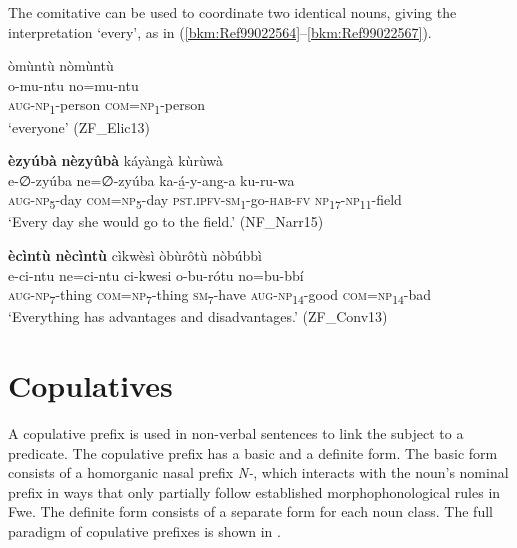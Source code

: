 The comitative can be used to coordinate two identical nouns, giving the interpretation ‘every’, as in (\ref{bkm:Ref99022564}--\ref{bkm:Ref99022567}).

\ea
\label{bkm:Ref99022564}
òmùntù nòmùntù\\
\gll o-mu-ntu    no=mu-ntu\\
\textsc{aug}-\textsc{np}\textsubscript{1}-person  \textsc{com}=\textsc{np}\textsubscript{1}-person\\
\glt ‘everyone’ (ZF\_Elic13)
\z

\ea
\textbf{èzyúbà} \textbf{nèzyûbà} káyàngà kùrùwà\\
\gll e-∅-zyúba    ne=∅-zyúba    ka-á̲-y-ang-a    ku-ru-wa\\
\textsc{aug}-\textsc{np}\textsubscript{5}-day  \textsc{com}=\textsc{np}\textsubscript{5}-day  \textsc{pst}.\textsc{ipfv}-\textsc{sm}\textsubscript{1}-go-\textsc{hab}-\textsc{fv}  \textsc{np}\textsubscript{17}-\textsc{np}\textsubscript{11}-field\\
\glt ‘Every day she would go to the field.’ (NF\_Narr15)
\z

\ea
\label{bkm:Ref99022567}
\textbf{ècìntù} \textbf{nècìntù} cìkwèsì òbùrôtù nòbúbbì\\
\gll e-ci-ntu    ne=ci-ntu ci-kwesi  o-bu-rótu     no=bu-bbí\\
\textsc{aug}-\textsc{np}\textsubscript{7}-thing  \textsc{com}=\textsc{np}\textsubscript{7}-thing
\textsc{sm}\textsubscript{7}-have  \textsc{aug}-\textsc{np}\textsubscript{14}-good  \textsc{com}=\textsc{np}\textsubscript{14}-bad\\
\glt ‘Everything has advantages and disadvantages.’ (ZF\_Conv13)
\z
\section{Copulatives}
\label{bkm:Ref489963307}\hypertarget{Toc75352654}{}\label{bkm:Ref450747606}
A copulative prefix is used in non\nobreakdash-verbal sentences to link the subject to a predicate. The copulative prefix has a basic and a definite form. The basic form consists of a homorganic nasal prefix \textit{N-}, which interacts with the noun’s nominal prefix in ways that only partially follow established morphophonological rules in Fwe. The definite form consists of a separate form for each noun class. The full paradigm of copulative prefixes is shown in .

